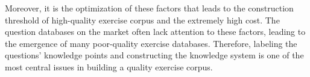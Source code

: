 Moreover, it is the optimization of these factors that leads to the construction threshold of high-quality exercise corpus and the extremely high cost. The question databases on the market often lack attention to these factors, leading to the emergence of many poor-quality exercise databases. Therefore, labeling the questions' knowledge points and constructing the knowledge system is one of the most central issues in building a quality exercise corpus.


